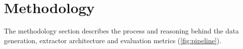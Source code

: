 \section{Methodology}
\label{sec:methodology}
The methodology section describes the process and reasoning behind the data generation, extractor architecture and evaluation metrics (\autoref{fig:pipeline}). 





